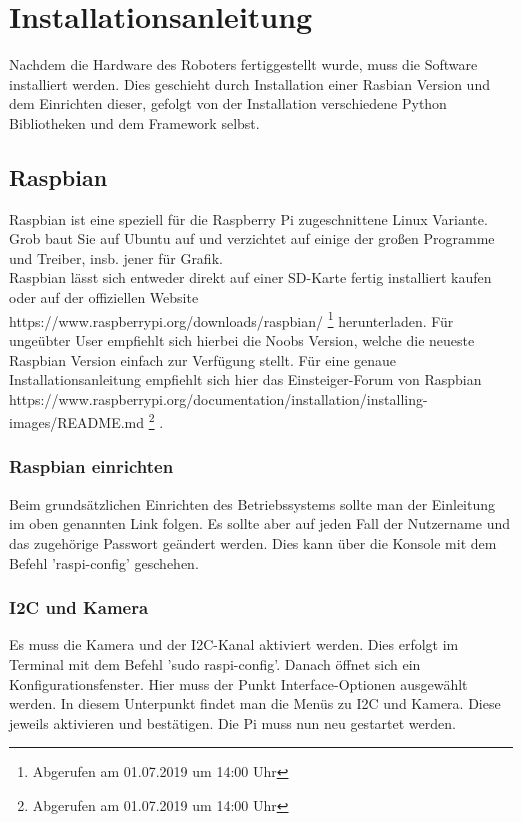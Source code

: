 \documentclass[twoside,11pt, a4paper]{report}
\begin{document}
	\chapter{Installationsanleitung}
	Nachdem die Hardware des Roboters fertiggestellt wurde, muss die Software installiert werden. Dies geschieht durch Installation einer Rasbian Version und dem Einrichten dieser, gefolgt von der Installation verschiedene Python Bibliotheken und dem Framework selbst. 
	\section{Raspbian}
	Raspbian ist eine speziell für die Raspberry Pi zugeschnittene Linux Variante. Grob baut Sie auf Ubuntu auf und verzichtet auf einige der großen Programme und Treiber, insb. jener für Grafik. \\
	Raspbian lässt sich entweder direkt auf einer SD-Karte fertig installiert kaufen oder auf der offiziellen Website\\ https://www.raspberrypi.org/downloads/raspbian/ \footnote{Abgerufen am 01.07.2019 um 14:00 Uhr}
	herunterladen. Für ungeübter User empfiehlt sich hierbei die Noobs Version, welche die neueste Raspbian Version einfach zur Verfügung stellt. Für eine genaue Installationsanleitung empfiehlt sich hier das Einsteiger-Forum von Raspbian https://www.raspberrypi.org/documentation/installation/installing-images/README.md \footnote{Abgerufen am 01.07.2019 um 14:00 Uhr}
	.
	
	\subsection{Raspbian einrichten}
	Beim grundsätzlichen Einrichten des Betriebssystems sollte man der Einleitung im oben genannten Link folgen. Es sollte aber auf jeden Fall der Nutzername und das zugehörige Passwort geändert werden. Dies kann über die Konsole mit dem Befehl 'raspi-config' geschehen. \\
	
	\subsection{I2C und Kamera}
	Es muss die Kamera und der I2C-Kanal aktiviert werden. Dies erfolgt im Terminal mit dem Befehl 'sudo raspi-config'. Danach öffnet sich ein Konfigurationsfenster. Hier muss der Punkt Interface-Optionen ausgewählt werden. In diesem Unterpunkt findet man die Menüs zu I2C und Kamera. Diese jeweils aktivieren und bestätigen. Die Pi muss nun neu gestartet werden. 
	
\end{document}
